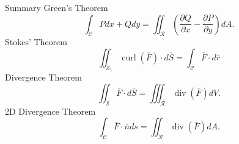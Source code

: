 \documentclass{beamer}
\begin{document}
    \begin{frame}{Summary}
    Green's Theorem\\
        \begin{equation*}
            \int_{\mathcal{C}} Pdx + Qdy = \iint_{\mathcal{R}} \left( \dfrac{\partial Q}{\partial x} - \dfrac{\partial P}{\partial y}\right) dA.
        \end{equation*}
        Stokes' Theorem\\
        \begin{equation*}
            \iint_{\mathcal{S}_1} \operatorname{curl}(\bar{F}) \cdot d \bar{S} = \int_{\mathcal{C}} \bar{F} \cdot d \bar{r}
        \end{equation*}
        Divergence Theorem\\
        \begin{equation*}
            \iint_{\mathcal{S}} \bar{F} \cdot d\bar{S} = \iiint_{\mathcal{R}} \operatorname{div}(\bar{F}) dV.
        \end{equation*}
        2D Divergence Theorem\\
        \begin{equation*}
            \int_{\mathcal{C}} \bar{F} \cdot\bar{n} ds = \iint_{\mathcal{R}} \operatorname{div}(\bar{F}) dA.
        \end{equation*}
    \end{frame}
\end{document}
